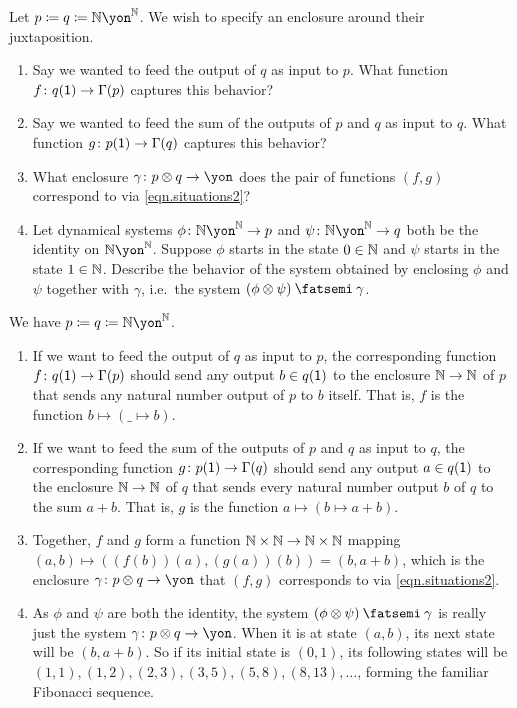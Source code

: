 \documentclass[Book-Poly]{subfiles}
\begin{document}
\begin{exercise}
Let $p\coloneqq q\coloneqq\nn\yon^\nn$.
We wish to specify an enclosure around their juxtaposition.
\begin{enumerate}
    \item Say we wanted to feed the output of $q$ as input to $p$.
    What function $f\colon q(\textsf{1})\to\Gamma(p)$ captures this behavior?
    \item Say we wanted to feed the sum of the outputs of $p$ and $q$ as input to $q$.
    What function $g\colon p(\textsf{1})\to\Gamma(q)$ captures this behavior?
    \item What enclosure $\gamma\colon p\otimes q\to\yon$ does the pair of functions $(f,g)$ correspond to via \eqref{eqn.situations2}?
	\item Let dynamical systems $\phi\colon\nn\yon^\nn\to p$ and $\psi\colon\nn\yon^\nn\to q$ both be the identity on $\nn\yon^\nn$.
	Suppose $\phi$ starts in the state $0\in\mathbb{N}$ and $\psi$ starts in the state $1\in\mathbb{N}$.
	Describe the behavior of the system obtained by enclosing $\phi$ and $\psi$ together with $\gamma$, i.e.\ the system $(\phi\otimes\psi)\then\gamma$.
\qedhere
\end{enumerate}
\begin{solution}
We have $p\coloneqq q\coloneqq\nn\yon^\nn$.
\begin{enumerate}
    \item If we want to feed the output of $q$ as input to $p$, the corresponding function $f\colon q(\textsf{1})\to\Gamma(p)$ should send any output $b\in q(\textsf{1})$ to the enclosure $\mathbb{N}\to\mathbb{N}$ of $p$ that sends any natural number output of $p$ to $b$ itself.
    That is, $f$ is the function $b\mapsto(\_\mapsto b)$.
    \item If we want to feed the sum of the outputs of $p$ and $q$ as input to $q$, the corresponding function $g\colon p(\textsf{1})\to\Gamma(q)$ should send any output $a\in q(\textsf{1})$ to the enclosure $\mathbb{N}\to\mathbb{N}$ of $q$ that sends every natural number output $b$ of $q$ to the sum $a+b$.
    That is, $g$ is the function $a\mapsto(b\mapsto a+b)$.
    \item Together, $f$ and $g$ form a function $\mathbb{N}\times\mathbb{N}\to\mathbb{N}\times\mathbb{N}$ mapping $(a,b)\mapsto((f(b))(a),(g(a))(b))=(b,a+b)$, which is the enclosure $\gamma\colon p\otimes q\to\yon$ that $(f,g)$ corresponds to via \eqref{eqn.situations2}.
    \item As $\phi$ and $\psi$ are both the identity, the system $(\phi\otimes\psi)\then\gamma$ is really just the system $\gamma\colon p\otimes q\to\yon$.
    When it is at state $(a,b)$, its next state will be $(b,a+b)$.
    So if its initial state is $(0,1)$, its following states will be $(1,1),(1,2),(2,3),(3,5),(5,8),(8,13),\ldots$, forming the familiar Fibonacci sequence. 
\end{enumerate}
\end{solution}
\end{exercise}
\end{document}
